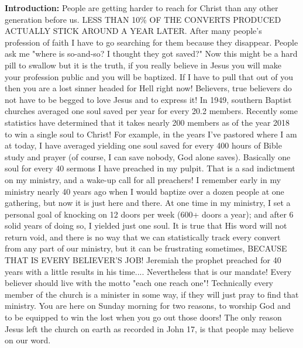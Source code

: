 \textbf{Introduction: }People are getting harder to reach for Christ than any other generation before us. LESS THAN 10\% OF THE CONVERTS PRODUCED ACTUALLY STICK AROUND A YEAR LATER.  After many people's profession of faith I have to go searching for them because they disappear.  People ask me "where is so-and-so? I thought they got saved?" Now this might be a hard pill to swallow but it is the truth, if you really believe in Jesus you will make your profession public and you will be baptized. If I have to pull that out of you then you are a lost sinner headed for Hell right now!  Believers, true believers do not have to be begged to love Jesus and to express it! In 1949, southern Baptist churches averaged one soul saved per year for every 20.2 members. Recently some statistics have determined that it takes nearly 200 members as of the year 2018 to win a single soul to Christ! For example, in the years I've pastored where I am at today, I have averaged yielding one soul saved for every 400 hours of Bible study and prayer (of course, I can save nobody, God alone saves). Basically one soul for every 40 sermons I have preached in my pulpit. That is a sad indictment on my ministry, and a wake-up call for all preachers!  I remember early in my ministry nearly 40 years ago when I would baptize over a dozen people at one gathering, but now it is just here and there.   At one time in my ministry, I set a personal goal of knocking on 12 doors per week (600+ doors a year); and after 6 solid years of doing so, I yielded just one soul.   It is true that His word will not return void, and there is no way that we can statistically track every convert from any part of our ministry, but it can be frustrating sometimes, BECAUSE THAT IS EVERY BELIEVER'S JOB! Jeremiah the prophet preached for 40 years with a little results in his time.... Nevertheless that is our mandate! Every believer should live with the motto "each one reach one"!  Technically every member of the church is a minister in some way, if they will just pray to find that ministry.  You are here on Sunday morning for two reasons, to worship God and to be equipped to win the lost when you go out those doors!  The only reason Jesus left the church on earth as recorded in John 17,  is that people may believe on our word.
